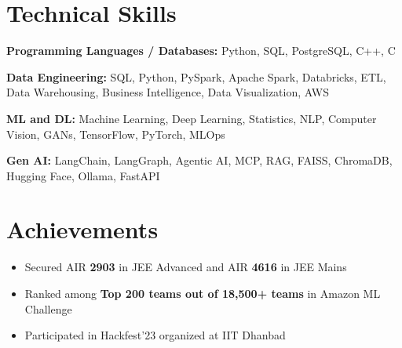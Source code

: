 \documentclass[a4paper,10pt]{article}
\begin{document}
\section{Technical Skills}

\small
\textbf{Programming Languages / Databases:}
Python, SQL, PostgreSQL, C++, C

\vspace{2pt}

\textbf{Data Engineering:}
SQL, Python, PySpark, Apache Spark, Databricks, ETL, Data Warehousing, Business Intelligence, Data Visualization, AWS

\vspace{2pt}

\textbf{ML and DL:}
Machine Learning, Deep Learning, Statistics, NLP, Computer Vision, GANs, TensorFlow, PyTorch, MLOps

\vspace{2pt}

\textbf{Gen AI:}
LangChain, LangGraph, Agentic AI, MCP, RAG, FAISS, ChromaDB, Hugging Face, Ollama, FastAPI

\section{Achievements}

\begin{itemize}[leftmargin=0.18in,itemsep=2pt]
\item Secured AIR \textbf{2903} in JEE Advanced and AIR \textbf{4616} in JEE Mains
\item Ranked among \textbf{Top 200 teams out of 18,500+ teams} in Amazon ML Challenge
\item Participated in Hackfest'23 organized at IIT Dhanbad
\end{itemize}
\end{document}
